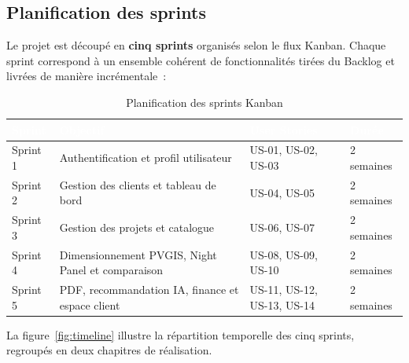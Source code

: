 \subsection{Planification des sprints}

Le projet est découpé en \textbf{cinq sprints} organisés selon le flux
Kanban. Chaque sprint correspond à un ensemble cohérent de fonctionnalités
tirées du Backlog et livrées de manière incrémentale~:

\begin{table}[H]
  \caption{Planification des sprints Kanban}
  \label{tab:sprints}
  \centering
  \begin{tabularx}{\textwidth}{|C{1.6cm}|L{4.2cm}|X|C{1.8cm}|}
    \hline
    \textcolor{white}{\textbf{Sprint}} &
    \textcolor{white}{\textbf{Objectif}} &
    \textcolor{white}{\textbf{User Stories}} &
    \textcolor{white}{\textbf{Durée}} \\
    \hline
    Sprint 1 & Authentification et profil utilisateur & US-01, US-02, US-03 & 2 semaines \\
    \hline
    Sprint 2 & Gestion des clients et tableau de bord & US-04, US-05 & 2 semaines \\
    \hline
    Sprint 3 & Gestion des projets et catalogue & US-06, US-07 & 2 semaines \\
    \hline
    Sprint 4 & Dimensionnement PVGIS, Night Panel et comparaison & US-08, US-09, US-10 & 2 semaines \\
    \hline
    Sprint 5 & PDF, recommandation IA, finance et espace client & US-11, US-12, US-13, US-14 & 2 semaines \\
    \hline
  \end{tabularx}
\end{table}

\noindent La figure~\ref{fig:timeline} illustre la répartition temporelle
des cinq sprints, regroupés en deux chapitres de réalisation.

